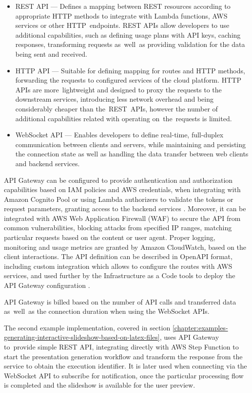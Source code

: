 \begin{itemize}
   \item REST API ---
   Defines a mapping between REST resources according to appropriate HTTP methods to integrate with Lambda functions, AWS services or other HTTP~endpoints.
   REST APIs allow developers to use additional capabilities, such as defining usage plans with API keys, caching responses, transforming requests as~well~as providing validation for the data being sent and received.
   \item HTTP API ---
   Suitable for defining mapping for routes and HTTP methods, forwarding the requests to configured services of the cloud platform.
   HTTP APIs are more~lightweight and designed to proxy the requests to the downstream services, introducing less network overhead and being considerably cheaper than the~REST~APIs, however the number of additional capabilities related with operating on~the~requests is limited.
   \item WebSocket API ---
   Enables developers to define real-time, full-duplex communication between clients and servers, while maintaining and persisting the connection state as well as handling the data transfer between web clients and backend services.
\end{itemize}

API Gateway can be configured to provide authentication and authorization capabilities based on IAM policies and AWS credentials, when integrating with Amazon Cognito Pool or using Lambda authorizers to validate the tokens or request parameters, granting access to the backend services \cite{IDidntKnowAmazonAPIGatewayDidThat}.
Moreover, it can be integrated with AWS Web Application Firewall (WAF) to secure the API from common vulnerabilities, blocking attacks from specified IP ranges, matching particular requests based on the content or user agent.
Proper logging, monitoring and usage metrics are granted by Amazon CloudWatch, based on the client interactions.
The API definition can be described in OpenAPI format, including custom integration which allows to configure the routes with AWS services, and used further by the Infrastructure as a Code tools to deploy the API Gateway configuration \cite{ApiGatewayFeatures}.

API Gateway is billed based on the number of API calls and transferred data as~well~as the connection duration when using the WebSocket APIs.

The second example implementation, covered in section \ref{chapter:examples-generating-interactive-slideshow-based-on-latex-files}, uses API Gateway to~provide simple REST API, integrating directly with AWS Step Function to start the presentation generation workflow and transform the response from the service to obtain the execution identifier.
It is later used when connecting via the WebSocket API to subscribe for notification, once the particular processing flow is completed and the slideshow is available for the user preview.

